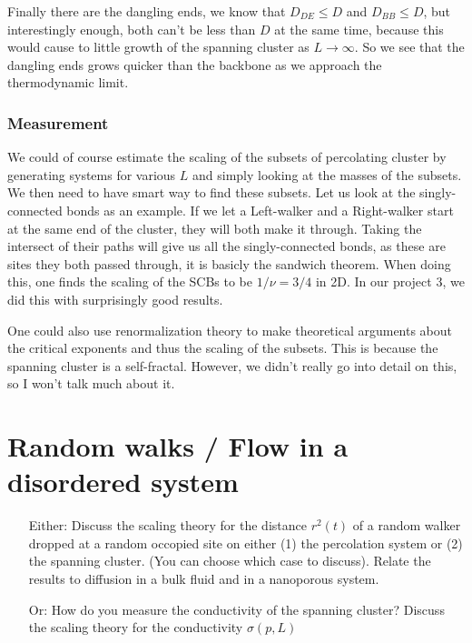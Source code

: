 \documentclass[a4paper, 11pt, notitlepage, english]{article}
\begin{document}
Finally there are the dangling ends, we know that $D_{DE} \leq D$ and $D_{BB} \leq D$, but interestingly enough, both can't be less than $D$ at the same time, because this would cause to little growth of the spanning cluster as $L \to \infty$. So we see that the dangling ends grows quicker than the backbone as we approach the thermodynamic limit.

\subsubsection*{Measurement}

We could of course estimate the scaling of the subsets of percolating cluster by generating systems for various $L$ and simply looking at the masses of the subsets. We then need to have smart way to find these subsets. Let us look at the singly-connected bonds as an example. If we let a Left-walker and a Right-walker start at the same end of the cluster, they will both make it through. Taking the intersect of their paths will give us all the singly-connected bonds, as these are sites they both passed through, it is basicly the sandwich theorem. When doing this, one finds the scaling of the SCBs to be $1/\nu = 3/4$ in 2D. In our project 3, we did this with surprisingly good results.

One could also use renormalization theory to make theoretical arguments about the critical exponents and thus the scaling of the subsets. This is because the spanning cluster is a self-fractal. However, we didn't really go into detail on this, so I won't talk much about it.


\clearpage


\section{ Random walks / Flow in a disordered system}
\begin{itemize}
\item[Either:] Discuss the scaling theory for the distance $r^2(t)$ of a random walker
dropped at a random occopied site on either (1) the percolation system or (2)
the spanning cluster. (You can choose which case to discuss). Relate the results
to diffusion in a bulk fluid and in a nanoporous system.
\item[Or: ] How do you measure the conductivity of the spanning cluster? Discuss the
scaling theory for the conductivity $\sigma(p, L)$
\end{itemize}
\end{document}
